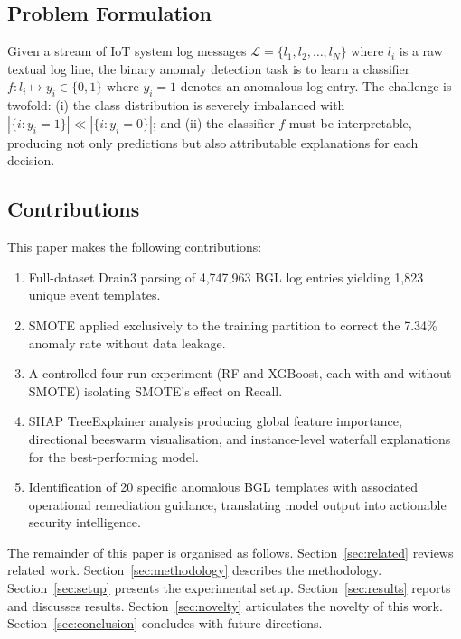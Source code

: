 \documentclass[conference]{IEEEtran}
\begin{document}
\subsection{Problem Formulation}

Given a stream of IoT system log messages
$\mathcal{L} = \{l_1, l_2, \ldots, l_N\}$ where $l_i$ is a raw textual log
line, the binary anomaly detection task is to learn a classifier
$f: l_i \mapsto y_i \in \{0, 1\}$ where $y_i = 1$ denotes an anomalous log
entry. The challenge is twofold: (i) the class distribution is severely
imbalanced with $|\{i : y_i = 1\}| \ll |\{i : y_i = 0\}|$; and (ii) the
classifier $f$ must be interpretable, producing not only predictions but also
attributable explanations for each decision.

\subsection{Contributions}

This paper makes the following contributions:

\begin{enumerate}
  \item Full-dataset Drain3 parsing of 4{,}747{,}963 BGL log entries yielding
        1{,}823 unique event templates.
  \item SMOTE applied exclusively to the training partition to correct the
        7.34\% anomaly rate without data leakage.
  \item A controlled four-run experiment (RF and XGBoost, each with and
        without SMOTE) isolating SMOTE's effect on Recall.
  \item SHAP TreeExplainer analysis producing global feature importance,
        directional beeswarm visualisation, and instance-level waterfall
        explanations for the best-performing model.
  \item Identification of 20 specific anomalous BGL templates with associated
        operational remediation guidance, translating model output into
        actionable security intelligence.
\end{enumerate}

The remainder of this paper is organised as follows. Section~\ref{sec:related}
reviews related work. Section~\ref{sec:methodology} describes the methodology.
Section~\ref{sec:setup} presents the experimental setup.
Section~\ref{sec:results} reports and discusses results.
Section~\ref{sec:novelty} articulates the novelty of this work.
Section~\ref{sec:conclusion} concludes with future directions.
\end{document}
